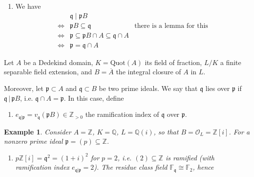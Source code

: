 \documentclass[a4paper]{book}
\theoremstyle{break}
\newtheorem{example}{Example}
\theoremstyle{plain}
\begin{document}
\begin{enumerate}
    \item We have
    \begin{align}
        & \mathfrak{q} \mid \mathfrak{p}B \\
        \iff & \mathfrak{p}B \subseteq \mathfrak{q} & \text{there is a lemma for this} \\
        \iff & \mathfrak{p} \subseteq \mathfrak{p} B \cap A \subseteq \mathfrak{q} \cap A & \\
        \iff & \mathfrak{p} = \mathfrak{q} \cap A &
    \end{align}
\end{enumerate}

\newpage

\begin{definition}
    Let \(A\) be a {\color{mathif}Dedekind domain}, \(K = \text{Quot}(A)\) its {\color{mathif}field of fraction}, \(L / K\) a {\color{mathif}finite separable field extension}, and \(B = \overline{A}\) the {\color{mathif}integral closure} of \(A\) in \(L\).
    
    Moreover, let \(\mathfrak{p} \subset A\) and \(\mathfrak{q} \subset B\) be two {\color{mathif}prime ideals}. We say that \(\mathfrak{q}\) {\color{mathrem}lies over} \(\mathfrak{p}\) if \(\mathfrak{q} \, | \, \mathfrak{p}B\), i.e. \(\mathfrak{q} \cap A = \mathfrak{p}\). In this case, define

    \begin{enumerate}
        \item \(e_{\mathfrak{q} | \mathfrak{p}} = v_\mathfrak{q}(\mathfrak{p}B) \in \mathbb{Z}_{>0}\) the {\color{maththen}ramification index} of \(\mathfrak{q}\) over \(\mathfrak{p}\).
    \end{enumerate}
\end{definition}

\begin{example}
    Consider \(A = \mathbb{Z}\), \(K = \mathbb{Q}\), \(L = \mathbb{Q}(i)\), so that \(B = \mathcal{O}_L = \mathbb{Z}[i]\). For a nonzero prime ideal \(\mathfrak{p} = (p) \subseteq \mathbb{Z}\).
    \begin{enumerate}
        \item \(p \mathbb{Z}[i] = \mathfrak{q}^2 = (1 + i)^2\) for \(p = 2\), i.e. \((2) \subseteq \mathbb{Z}\) is ramified (with ramification index \(e_{\mathfrak{q} | \mathfrak{p}} = 2\)). The residue class field \(\mathbb{F}_\mathfrak{q} \cong \mathbb{F}_2\), hence
    \end{enumerate}
\end{example}
\end{document}
